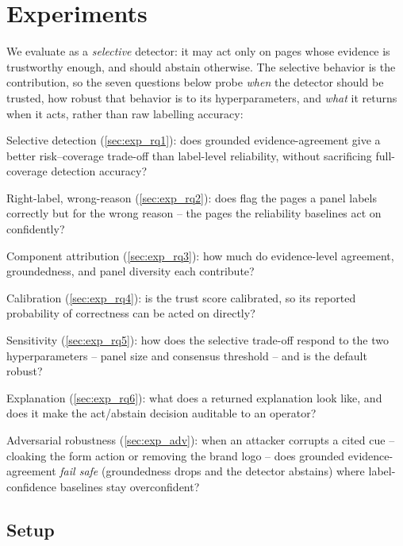 \section{Experiments}
\label{sec:experiments}

We evaluate \toolname{} as a \emph{selective} detector: it may act only on pages
whose evidence is trustworthy enough, and should abstain otherwise. The selective
behavior is the contribution, so the seven questions below probe \emph{when} the
detector should be trusted, how robust that behavior is to its hyperparameters, and
\emph{what} it returns when it acts, rather than raw labelling accuracy:
\begin{compactitem}
\item[(\textbf{RQ1})] Selective detection (\autoref{sec:exp_rq1}): does grounded
evidence-agreement give a better risk--coverage trade-off than label-level
reliability, without sacrificing full-coverage detection accuracy?
\item[(\textbf{RQ2})] Right-label, wrong-reason (\autoref{sec:exp_rq2}): does
\toolname{} flag the pages a panel labels correctly but for the wrong reason --
the pages the reliability baselines act on confidently?
\item[(\textbf{RQ3})] Component attribution (\autoref{sec:exp_rq3}): how much do
evidence-level agreement, groundedness, and panel diversity each contribute?
\item[(\textbf{RQ4})] Calibration (\autoref{sec:exp_rq4}): is the trust score
calibrated, so its reported probability of correctness can be acted on directly?
\item[(\textbf{RQ5})] Sensitivity (\autoref{sec:exp_rq5}): how does the selective
trade-off respond to the two hyperparameters -- panel size and consensus threshold --
and is the default robust?
\item[(\textbf{RQ6})] Explanation (\autoref{sec:exp_rq6}): what does a returned
explanation look like, and does it make the act/abstain decision auditable to an
operator?
\item[(\textbf{RQ7})] Adversarial robustness (\autoref{sec:exp_adv}): when an
attacker corrupts a cited cue -- cloaking the form action or removing the brand logo --
does grounded evidence-agreement \emph{fail safe} (groundedness drops and the detector
abstains) where label-confidence baselines stay overconfident?
\end{compactitem}

\subsection{Setup}
\label{sec:exp_setup}

